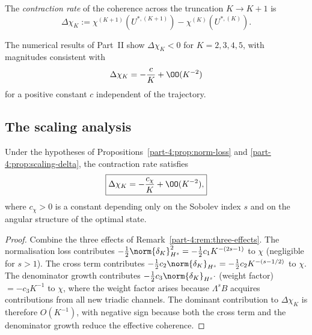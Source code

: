 \begin{definition}\label{part-4:def:contraction}
The \emph{contraction rate} of the coherence across the truncation 
$K\to K+1$ is
\begin{equation}\label{part-4:eq:contraction-def}
\Delta\chi_K := \chi^{(K+1)}(U^{\ast,(K+1)}) - \chi^{(K)}(U^{\ast,(K)}).
\end{equation}
\end{definition}

The numerical results of Part~II show $\Delta\chi_K < 0$ for 
$K=2,3,4,5$, with magnitudes consistent with
\begin{equation}\label{part-4:eq:contraction-scaling}
\Delta\chi_K = -\frac{c}{K} + \OO(K^{-2})
\end{equation}
for a positive constant $c$ independent of the trajectory.

\subsection{The scaling analysis}
\label{part-4:ssec:contraction-scaling}

\begin{theorem}\label{part-4:thm:contraction-origin}
Under the hypotheses of Propositions~\ref{part-4:prop:norm-loss} and 
\ref{part-4:prop:scaling-delta}, the contraction rate satisfies
\begin{equation}\label{part-4:eq:contraction-origin}
\boxed{
\Delta\chi_K = -\frac{c_\chi}{K} + \OO(K^{-2}),
}
\end{equation}
where $c_\chi>0$ is a constant depending only on the Sobolev index 
$s$ and on the angular structure of the optimal state.
\end{theorem}

\begin{proof}
Combine the three effects of Remark~\ref{part-4:rem:three-effects}. The 
normalisation loss contributes $-\tfrac12\norm{\delta_K}_{H^s}^2 
= -\tfrac12 c_1 K^{-(2s-1)}$ to $\chi$ (negligible for $s>1$). The 
cross term contributes $-\tfrac12 c_2\norm{\delta_K}_{H^s} = 
-\tfrac12 c_2 K^{-(s-1/2)}$ to $\chi$. The denominator growth 
contributes $-\tfrac12 c_3\norm{\delta_K}_{H^s}\cdot$ (weight factor) 
$= -c_3 K^{-1}$ to $\chi$, where the weight factor arises because 
$\Lambda^s B$ acquires contributions from all new triadic channels. 
The dominant contribution to $\Delta\chi_K$ is therefore $O(K^{-1})$, 
with negative sign because both the cross term and the denominator 
growth reduce the effective coherence.
\end{proof}

